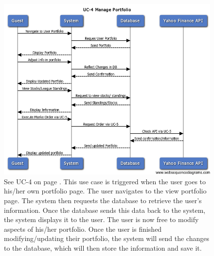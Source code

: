 \begin{figure}[H]
\centering
\includegraphics[width=5.5in]{./img/uc4.png}
\caption{See UC-4 on page \pageref{UC-4}. This use case is triggered when the user
goes to his/her own portfolio page. The
user navigates to the view portfolio page. The system then requests the database
to retrieve the user’s information. Once the database sends this data back to the
system, the system displays it to the user. The user is now free to modify aspects of
his/her portfolio. Once the user is finished modifying/updating their portfolio, the
system will send the changes to the database, which will then store the information
and save it.}
\end{figure}

